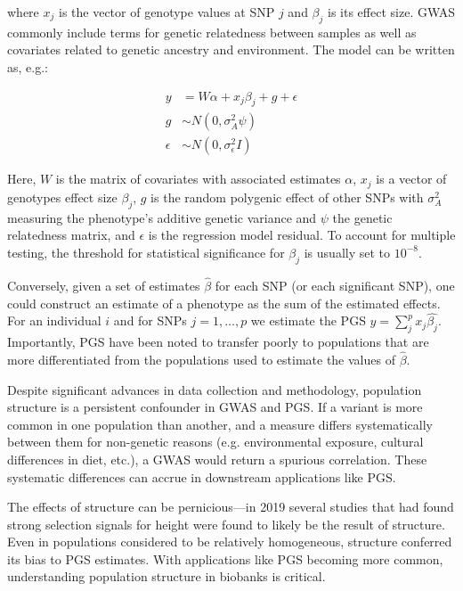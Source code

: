 where $x_{j}$ is the vector of genotype values at SNP $j$ and $\beta_{j}$ is its effect size. GWAS commonly include terms for genetic relatedness between samples as well as covariates related to genetic ancestry and environment. The model can be written as, e.g.\citep{uffelmann_genome-wide_2021}:

\begin{spacing}{1}
\begin{align*} 
y & = W\alpha + x_{j}\beta_{j} + g + \epsilon \\
g & \sim N(0,\sigma^{2}_{A}\psi) \\
\epsilon & \sim N(0,\sigma^{2}_{\epsilon}I)
\end{align*} 
\end{spacing}

Here, $W$ is the matrix of covariates with associated estimates $\alpha$, $x_{j}$ is a vector of genotypes effect size $\beta_{j}$, $g$ is the random polygenic effect of other SNPs with $\sigma^{2}_{A}$ measuring the phenotype's additive genetic variance and $\psi$ the genetic relatedness matrix, and $\epsilon$ is the regression model residual. To account for multiple testing, the threshold for statistical significance for $\beta_{j}$ is usually set to $10^{-8}$.

Conversely, given a set of estimates $\hat{\beta}$ for each SNP (or each significant SNP), one could construct an estimate of a phenotype as the sum of the estimated effects. For an individual $i$ and for SNPs $j = 1, \dots, p$ we estimate the PGS $y = \sum_{j}^{p}x_{j}\hat{\beta_{j}}$. Importantly, PGS have been noted to transfer poorly to populations that are more differentiated from the populations used to estimate the values of $\hat{\beta}$\citep{wang_theoretical_2020}.

Despite significant advances in data collection and methodology, population structure is a persistent confounder in GWAS and PGS. If a variant is more common in one population than another, and a measure differs systematically between them for non-genetic reasons (e.g. environmental exposure, cultural differences in diet, etc.), a GWAS would return a spurious correlation\citep{price_principal_2006}. These systematic differences can accrue in downstream applications like PGS\citep{zaidi_demographic_2020}. 

The effects of structure can be pernicious---in 2019 several studies that had found strong selection signals for height were found to likely be the result of structure\citep{berg_reduced_2019}. Even in populations considered to be relatively homogeneous, structure conferred its bias to PGS estimates\citep{kerminen_geographic_2019}. With applications like PGS becoming more common, understanding population structure in biobanks is critical\citep{kaplan_polygenic_2022}.

